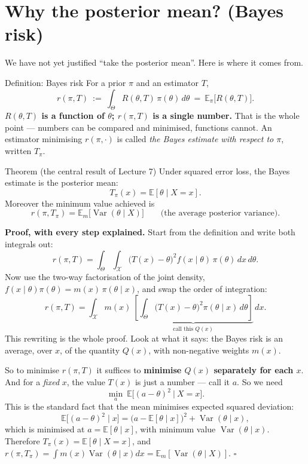 \documentclass[11pt]{article}
\newcommand{\E}{\mathbb{E}}
\newcommand{\Var}{\operatorname{Var}}
\begin{document}
\section{Why the posterior mean? (Bayes risk)}

We have not yet justified ``take the posterior mean''. Here is where it comes from.

\begin{idea}{Definition: Bayes risk}
For a prior $\pi$ and an estimator $T$,
\[
r(\pi,T)\ :=\ \int_\Theta R(\theta,T)\,\pi(\theta)\,d\theta\ =\ \E_\pi\big[R(\theta,T)\big].
\]
\textbf{$R(\theta,T)$ is a function of $\theta$; $r(\pi,T)$ is a single number.} That is the
whole point --- numbers can be compared and minimised, functions cannot. An estimator
minimising $r(\pi,\cdot)$ is called \emph{the Bayes estimate with respect to $\pi$}, written
$T_\pi$.
\end{idea}

\begin{idea}{Theorem (the central result of Lecture 7)}
Under squared error loss, the Bayes estimate is the posterior mean:
\[
T_\pi(x)=\E[\theta\mid X=x].
\]
Moreover the minimum value achieved is
\[
r(\pi,T_\pi)=\E_m\big[\Var(\theta\mid X)\big]\qquad\text{(the average posterior variance).}
\]
\end{idea}

\textbf{Proof, with every step explained.} Start from the definition and write both
integrals out:
\[
r(\pi,T)=\int_\Theta\!\!\int_{\mathcal X}\big(T(x)-\theta\big)^2 f(x\mid\theta)\,\pi(\theta)\,dx\,d\theta .
\]
Now use the two-way factorisation of the joint density,
$f(x\mid\theta)\pi(\theta)=m(x)\,\pi(\theta\mid x)$, and swap the order of integration:
\[
r(\pi,T)=\int_{\mathcal X} m(x)\ \underbrace{\left[\int_\Theta\big(T(x)-\theta\big)^2
\pi(\theta\mid x)\,d\theta\right]}_{\text{call this }Q(x)}\,dx .
\]
This rewriting is the whole proof. Look at what it says: the Bayes risk is an average, over
$x$, of the quantity $Q(x)$, with non-negative weights $m(x)$.

So to minimise $r(\pi,T)$ it suffices to \textbf{minimise $Q(x)$ separately for each $x$}.
And for a \emph{fixed} $x$, the value $T(x)$ is just a number --- call it $a$. So we need
\[
\min_a\ \E\big[(a-\theta)^2\ \big|\ X=x\big].
\]
This is the standard fact that the mean minimises expected squared deviation:
\[
\E\big[(a-\theta)^2\mid x\big]
=\big(a-\E[\theta\mid x]\big)^2+\Var(\theta\mid x),
\]
which is minimised at $a=\E[\theta\mid x]$, with minimum value $\Var(\theta\mid x)$.
Therefore $T_\pi(x)=\E[\theta\mid X=x]$, and
$r(\pi,T_\pi)=\int m(x)\Var(\theta\mid x)dx=\E_m[\Var(\theta\mid X)]$. $\square$
\end{document}
